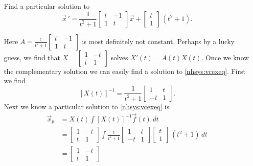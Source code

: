 \documentclass[12pt]{book}
\begin{document}
\begin{example}
Find a particular solution to
\begin{equation} \label{nhsys:vcexeq}
{\vec{x}\,}'
=
\frac{1}{t^2+1}
\begin{bmatrix}
t & -1 \\
1 & t
\end{bmatrix}
\vec{x}
+ \begin{bmatrix} t \\ 1 \end{bmatrix} \,(t^2+1) .
\end{equation}

Here $A = 
\frac{1}{t^2+1}
\left[ \begin{smallmatrix}
t & -1 \\
1 & t
\end{smallmatrix} \right]$ is most definitely not constant.
Perhaps by a lucky guess, we find that
$X = 
\left[ \begin{smallmatrix}
1 & -t \\
t & 1
\end{smallmatrix} \right]$ solves
$X'(t) = A(t) X(t)$.  Once we know the complementary solution we can easily find
a solution to \eqref{nhsys:vcexeq}.  First we find
\begin{equation*}
\left[ X(t) \right]^{-1}
=
\frac{1}{t^2+1}
\begin{bmatrix}
1 & t \\
-t & 1
\end{bmatrix} .
\end{equation*}
Next we know a particular solution to
\eqref{nhsys:vcexeq} is
\begin{equation*}
\begin{split}
\vec{x}_p & = 
X(t)
\int \left[X(t)\right]^{-1}\vec{f}(t) ~ dt 
\\
& =
\begin{bmatrix}
1 & -t \\
t & 1
\end{bmatrix} 
\int
\frac{1}{t^2+1}
\begin{bmatrix}
1 & t \\
-t & 1
\end{bmatrix}
\begin{bmatrix} t \\ 1 \end{bmatrix} \,(t^2+1) 
~dt
\\
& =
\begin{bmatrix}
1 & -t \\
t & 1
\end{bmatrix} 

\end{split}
\end{equation*}
\end{example}
\end{document}
